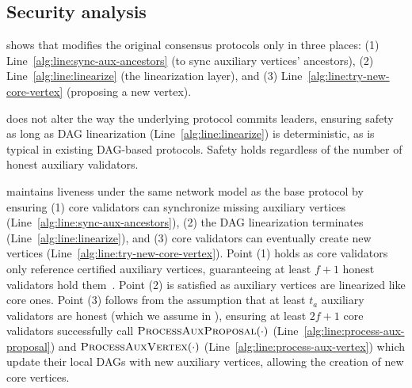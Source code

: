 \subsection{Security analysis} \label{sec:security}
 shows that \sysname modifies the original consensus protocols only in three places: (1) Line~\ref{alg:line:sync-aux-ancestors} (to sync auxiliary vertices' ancestors), (2) Line~\ref{alg:line:linearize} (the linearization layer), and (3) Line~\ref{alg:line:try-new-core-vertex} (proposing a new vertex).

\sysname does not alter the way the underlying protocol commits leaders, ensuring safety as long as DAG linearization (Line~\ref{alg:line:linearize}) is deterministic, as is typical in existing DAG-based protocols. Safety holds regardless of the number of honest auxiliary validators.

\sysname maintains liveness under the same network model as the base protocol by ensuring (1) core validators can synchronize missing auxiliary vertices (Line~\ref{alg:line:sync-aux-ancestors}), (2) the DAG linearization terminates (Line~\ref{alg:line:linearize}), and (3) core validators can eventually create new vertices (Line~\ref{alg:line:try-new-core-vertex}). Point (1) holds as core validators only reference certified auxiliary vertices, guaranteeing at least $f+1$ honest validators hold them~\cite{cachin2011introduction}. Point (2) is satisfied as auxiliary vertices are linearized like core ones. Point (3) follows from the assumption that at least $t_a$ auxiliary validators are honest (which we assume in ), ensuring at least $2f+1$ core validators successfully call $\Call{ProcessAuxProposal}{\cdot}$ (Line~\ref{alg:line:process-aux-proposal}) and $\Call{ProcessAuxVertex}{\cdot}$ (Line~\ref{alg:line:process-aux-vertex}) which update their local DAGs with new auxiliary vertices, allowing the creation of new core vertices.